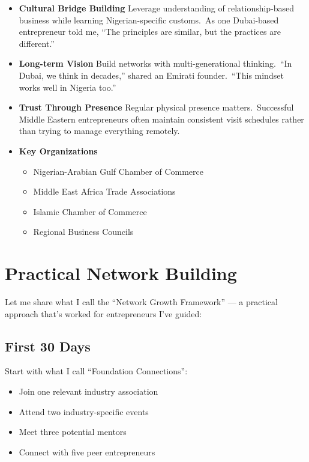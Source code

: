 \begin{itemize}
    \item \textbf{Cultural Bridge Building}
    Leverage understanding of relationship-based business while learning Nigerian-specific customs.\ As one Dubai-based entrepreneur told me, ``The principles are similar, but the practices are different.''

    \item \textbf{Long-term Vision}
    Build networks with multi-generational thinking.\ ``In Dubai, we think in decades,'' shared an Emirati founder.\ ``This mindset works well in Nigeria too.''

    \item \textbf{Trust Through Presence}
    Regular physical presence matters.\ Successful Middle Eastern entrepreneurs often maintain consistent visit schedules rather than trying to manage everything remotely.

    \item \textbf{Key Organizations}
    \begin{itemize}
        \item Nigerian-Arabian Gulf Chamber of Commerce
        \item Middle East Africa Trade Associations
        \item Islamic Chamber of Commerce
        \item Regional Business Councils
    \end{itemize}
\end{itemize}

\section{Practical Network Building}\label{sec:practical-networking}

Let me share what I call the ``Network Growth Framework'' --- a practical approach that's worked for entrepreneurs I've guided:

\subsection{First 30 Days}\label{subsec:first-30-days}

Start with what I call ``Foundation Connections'':
\begin{itemize}
    \item Join one relevant industry association
    \item Attend two industry-specific events
    \item Meet three potential mentors
    \item Connect with five peer entrepreneurs
\end{itemize}

